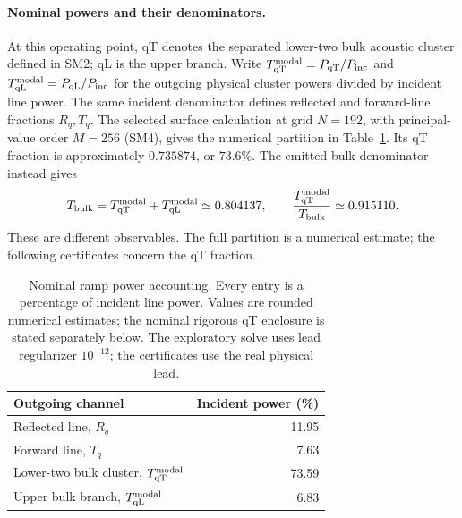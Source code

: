 \paragraph*{Nominal powers and their denominators.}
At this operating point, qT denotes the separated lower-two bulk acoustic cluster defined in SM2; qL is the upper branch. Write $T_{\mathrm{qT}}^{\rm modal}=P_{\mathrm{qT}}/P_{\rm inc}$ and $T_{\mathrm{qL}}^{\rm modal}=P_{\mathrm{qL}}/P_{\rm inc}$ for the outgoing physical cluster powers divided by incident line power. The same incident denominator defines reflected and forward-line fractions $R_q,T_q$. The selected surface calculation at grid $N=192$, with principal-value order $M=256$ (SM4), gives the numerical partition in Table~\ref{tab:sm-ramp-partition}. Its qT fraction is approximately $0.735874$, or $73.6\%$. The emitted-bulk denominator instead gives
\begin{equation}
 T_{\rm bulk}=T_{\mathrm{qT}}^{\rm modal}+T_{\mathrm{qL}}^{\rm modal}
 \simeq0.804137,\qquad
 \frac{T_{\mathrm{qT}}^{\rm modal}}{T_{\rm bulk}}\simeq0.915110.
 \label{eq:sm-ramp-bulk-share}
\end{equation}
These are different observables. The full partition is a numerical estimate; the following certificates concern the qT fraction.

\begin{table}[!htbp]
 \centering
 \caption{Nominal ramp power accounting. Every entry is a percentage of incident line power. Values are rounded numerical estimates; the nominal rigorous qT enclosure is stated separately below. The exploratory solve uses lead regularizer $10^{-12}$; the certificates use the real physical lead.}
 \label{tab:sm-ramp-partition}
 \begin{tabular}{lr}
  \toprule
  Outgoing channel & Incident power (\%)\\
  \midrule
  Reflected line, $R_q$ & 11.95\\
  Forward line, $T_q$ & 7.63\\
  Lower-two bulk cluster, $T_{\mathrm{qT}}^{\rm modal}$ & 73.59\\
  Upper bulk branch, $T_{\mathrm{qL}}^{\rm modal}$ & 6.83\\
  \bottomrule
 \end{tabular}
\end{table}

